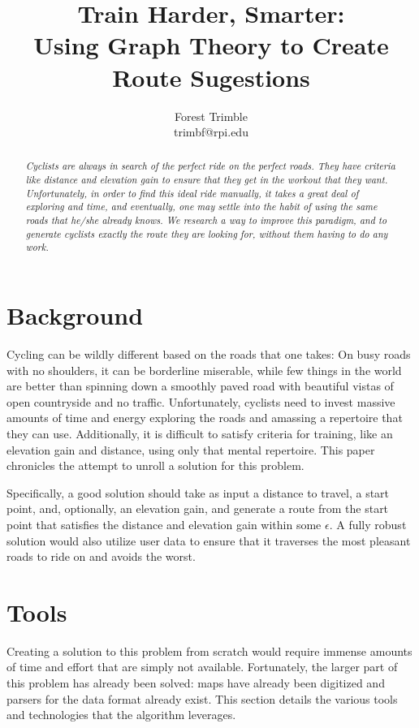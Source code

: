 \documentclass[twocolumn,11pt]{article}
\title{Train Harder, Smarter:\\Using Graph Theory to Create Route Sugestions}
\author{Forest Trimble\\trimbf@rpi.edu}
\begin{document}
\pagestyle{fancy}
\fancyhead{}
\maketitle

\begin{abstract}
  \emph{Cyclists are always in search of the perfect ride on the perfect
  roads. They have criteria like distance and elevation gain to ensure
  that they get in the workout that they want. Unfortunately, in order to
  find this ideal ride manually, it takes a great deal of exploring and
  time, and eventually, one may settle into the habit of using the same
  roads that he/she already knows. We research a way to improve this
  paradigm, and to generate cyclists exactly the route they are looking
  for, without them having to do any work.}
\end{abstract}

\section{Background}

Cycling can be wildly different based on the roads that one takes: On busy
roads with no shoulders, it can be borderline miserable, while few things in
the world are better than spinning down a smoothly paved road with beautiful
vistas of open countryside and no traffic. Unfortunately, cyclists need to
invest massive amounts of time and energy exploring the roads and amassing a
repertoire that they can use. Additionally, it is difficult to satisfy criteria
for training, like an elevation gain and distance, using only that mental
repertoire. This paper chronicles the attempt to unroll a solution for this
problem.

Specifically, a good solution should take as input a distance to travel, a
start point, and, optionally, an elevation gain, and generate a route from the
start point that satisfies the distance and elevation gain within some
$\epsilon$. A fully robust solution would also utilize user data to ensure that
it traverses the most pleasant roads to ride on and avoids the worst.

\section{Tools}

Creating a solution to this problem from scratch would require immense amounts
of time and effort that are simply not available. Fortunately, the larger part
of this problem has already been solved: maps have already been digitized and
parsers for the data format already exist. This section details the various
tools and technologies that the algorithm leverages.
\end{document}
